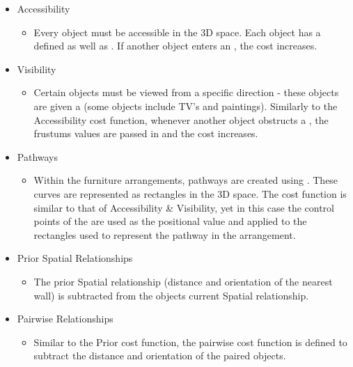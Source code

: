 \begin{itemize}
    \item Accessibility
        \begin{itemize}
            \item Every object must be accessible in the 3D space. Each object has a defined  as well as . If another object enters an , the cost increases. %
        \end{itemize}
    \item Visibility
        \begin{itemize}
            \item Certain objects must be viewed from a specific direction - these objects are given a  (some objects include TV's and paintings). Similarly to the Accessibility cost function, whenever another object obstructs a , the frustums values are passed in and the cost increases.
        \end{itemize}
    \item Pathways
        \begin{itemize}
            \item Within the furniture arrangements, pathways are created using . These curves are represented as rectangles in the 3D space. The cost function is similar to that of Accessibility \& Visibility, yet in this case the control points of the  are used as the positional value and applied to the rectangles used to represent the pathway in the arrangement.
        \end{itemize}
    \item Prior Spatial Relationships
        \begin{itemize}
            \item The prior Spatial relationship (distance and orientation of the nearest wall) is subtracted from the objects current Spatial relationship.
        \end{itemize}
    \item Pairwise Relationships
        \begin{itemize}
            \item Similar to the Prior cost function, the pairwise cost function is defined to subtract the distance and orientation of the paired objects.
        \end{itemize}
\end{itemize}
